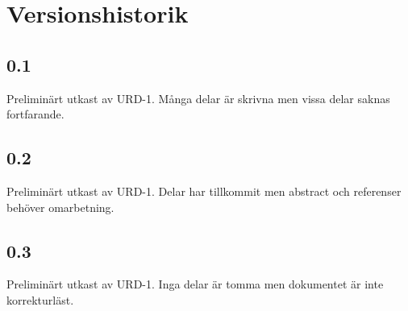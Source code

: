 \section*{Versionshistorik}

\subsection*{0.1}
Preliminärt utkast av URD-1. Många delar är skrivna men vissa delar saknas fortfarande.

\subsection*{0.2}
Preliminärt utkast av URD-1. Delar har tillkommit men abstract och referenser behöver omarbetning.

\subsection*{0.3}
Preliminärt utkast av URD-1. Inga delar är tomma men dokumentet är inte korrekturläst.
